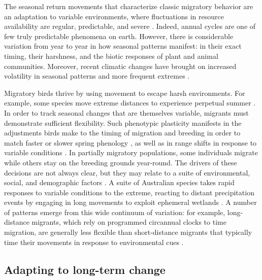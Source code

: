 \documentclass[a4paper, nobind]{templates/ociamthesis}
\begin{document}
The seasonal return movements that characterize classic migratory behavior are an adaptation to variable environments, where fluctuations in resource availability are regular, predictable, and severe \autocite{wingerLongWinterRed2019}. Indeed, annual cycles are one of few truly predictable phenomena on earth. However, there is considerable variation from year to year in how seasonal patterns manifest: in their exact timing, their harshness, and the biotic responses of plant and animal communities. Moreover, recent climatic changes have brought on increased volatility in seasonal patterns and more frequent extremes \autocite{ipccClimateChange20142014}.

Migratory birds thrive by using movement to escape harsh environments. For example, some species move extreme distances to experience perpetual summer \autocite{shafferMigratoryShearwatersIntegrate2006,newtonMigrationEcologyBirds2008}. In order to track seasonal changes that are themselves variable, migrants must demonstrate sufficient flexibility. Such phenotypic plasticity manifests in the adjustments birds make to the timing of migration and breeding in order to match faster or slower spring phenology \autocite{charmantierAdaptivePhenotypicPlasticity2008,charmantierClimateChangeTiming2014,usuiTemporalShiftsTemperature2017,hortonPhenologyNocturnalAvian2020}, as well as in range shifts in response to variable conditions \autocite[e.g.~][]{batemanImportanceRangeEdges2015}. In partially migratory populations, some individuals migrate while others stay on the breeding grounds year-round. The drivers of these decisions are not always clear, but they may relate to a suite of environmental, social, and demographic factors \autocite{chapmanEcologyEvolutionPartial2011}. A suite of Australian species takes rapid responses to variable conditions to the extreme, reacting to distant precipitation events by engaging in long movements to exploit ephemeral wetlands \autocite{pedlerLongdistanceFlightsHighrisk2018}. A number of patterns emerge from this wide continuum of variation: for example, long-distance migrants, which rely on programmed circannual clocks to time migration, are generally less flexible than short-distance migrants that typically time their movements in response to environmental cues \autocite{newtonMigrationEcologyBirds2008}.

\hypertarget{adapting-to-long-term-change}{%
\subsection*{Adapting to long-term change}\label{adapting-to-long-term-change}}
\end{document}
